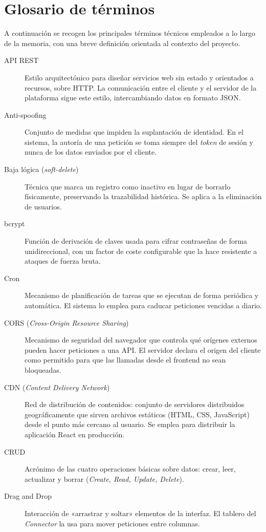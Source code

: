 \documentclass[11pt,oneside,spanish,listoffigures,listoftables]{tfgetsinf}
\begin{document}
\section{Glosario de términos}

A continuación se recogen los principales términos técnicos empleados a lo largo de la memoria, con una breve definición orientada al contexto del proyecto.

\begin{description}
  \item[API REST] Estilo arquitectónico para diseñar servicios web sin estado y orientados a recursos, sobre HTTP. La comunicación entre el cliente y el servidor de la plataforma sigue este estilo, intercambiando datos en formato JSON.
  \item[Anti-spoofing] Conjunto de medidas que impiden la suplantación de identidad. En el sistema, la autoría de una petición se toma siempre del \textit{token} de sesión y nunca de los datos enviados por el cliente.
  \item[Baja lógica (\textit{soft-delete})] Técnica que marca un registro como inactivo en lugar de borrarlo físicamente, preservando la trazabilidad histórica. Se aplica a la eliminación de usuarios.
  \item[bcrypt] Función de derivación de claves usada para cifrar contraseñas de forma unidireccional, con un factor de coste configurable que la hace resistente a ataques de fuerza bruta.
  \item[Cron] Mecanismo de planificación de tareas que se ejecutan de forma periódica y automática. El sistema lo emplea para caducar peticiones vencidas a diario.
  \item[CORS (\textit{Cross-Origin Resource Sharing})] Mecanismo de seguridad del navegador que controla qué orígenes externos pueden hacer peticiones a una API. El servidor declara el origen del cliente como permitido para que las llamadas desde el frontend no sean bloqueadas.
  \item[CDN (\textit{Content Delivery Network})] Red de distribución de contenidos: conjunto de servidores distribuidos geográficamente que sirven archivos estáticos (HTML, CSS, JavaScript) desde el punto más cercano al usuario. Se emplea para distribuir la aplicación React en producción.
  \item[CRUD] Acrónimo de las cuatro operaciones básicas sobre datos: crear, leer, actualizar y borrar (\textit{Create, Read, Update, Delete}).
  \item[Drag and Drop] Interacción de «arrastrar y soltar» elementos de la interfaz. El tablero del \textit{Connector} la usa para mover peticiones entre columnas.

\end{description}
\end{document}

